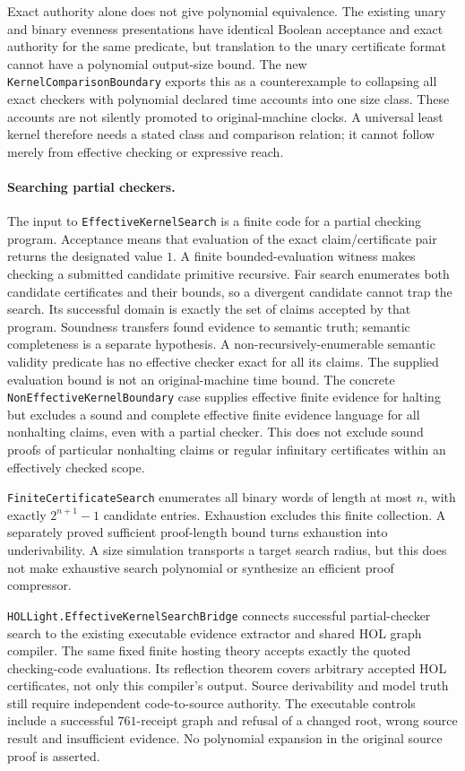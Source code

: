 \documentclass[11pt]{article}
\newcommand{\code}[1]{\nolinkurl{#1}}
\begin{document}
Exact authority alone does not give polynomial equivalence. The existing
unary and binary evenness presentations have identical Boolean acceptance
and exact authority for the same predicate, but translation to the unary
certificate format cannot have a polynomial output-size bound. The new
\code{KernelComparisonBoundary} exports this as a counterexample to collapsing
all exact checkers with polynomial declared time accounts into one size
class. These accounts are not silently promoted to original-machine clocks.
A universal least kernel therefore needs a stated class and comparison
relation; it cannot follow merely from effective checking or expressive reach.

\paragraph{Searching partial checkers.}
The input to \code{EffectiveKernelSearch} is a finite code for a partial
checking program. Acceptance means that evaluation of the exact claim/certificate pair
returns the designated value $1$. A finite bounded-evaluation witness makes
checking a submitted candidate primitive recursive. Fair search enumerates
both candidate certificates and their bounds, so a divergent candidate cannot
trap the search. Its successful domain is exactly the set of claims accepted
by that program. Soundness transfers found evidence to semantic truth;
semantic completeness is a separate hypothesis. A non-recursively-enumerable
semantic validity predicate has no effective checker exact for all its claims.
The supplied evaluation bound is not an original-machine time bound.
The concrete \code{NonEffectiveKernelBoundary} case supplies effective finite
evidence for halting but excludes a sound and complete effective finite
evidence language for all nonhalting claims, even with a partial checker.
This does not exclude sound proofs of particular nonhalting claims or regular
infinitary certificates within an effectively checked scope.

\code{FiniteCertificateSearch} enumerates all binary words of length at most
$n$, with exactly $2^{n+1}-1$ candidate entries. Exhaustion excludes this
finite collection. A separately proved sufficient proof-length bound turns
exhaustion into underivability. A size simulation transports a target search
radius, but this does not make exhaustive search polynomial or synthesize an
efficient proof compressor.

\code{HOLLight.EffectiveKernelSearchBridge} connects successful partial-checker
search to the existing executable evidence extractor and shared HOL graph
compiler. The same fixed finite hosting theory accepts exactly the quoted
checking-code evaluations. Its reflection theorem covers arbitrary accepted
HOL certificates, not only this compiler's output. Source derivability and
model truth still require independent code-to-source authority. The executable
controls include a successful $761$-receipt graph and refusal of a changed
root, wrong source result and insufficient evidence. No polynomial expansion
in the original source proof is asserted.
\end{document}

